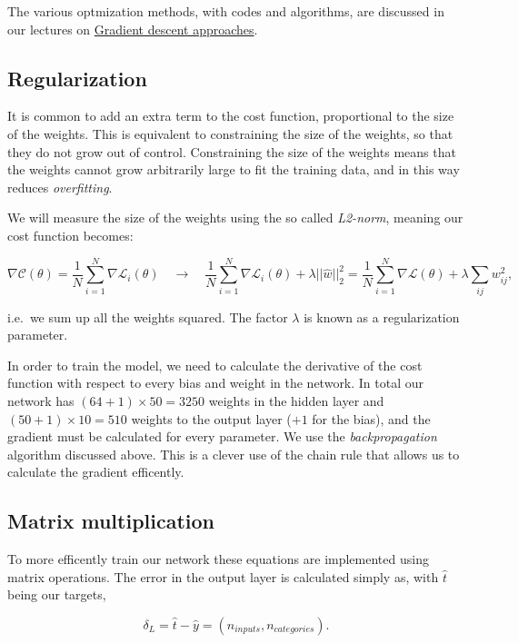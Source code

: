 \documentclass[%
oneside,                 %
final,                   %
10pt]{article}
\begin{document}
\noindent
The various optmization  methods, with codes and algorithms,  are discussed in our lectures on \href{{https://compphysics.github.io/MachineLearning/doc/pub/Splines/html/Splines-bs.html}}{Gradient descent approaches}.

\subsection{Regularization}

It is common to add an extra term to the cost function, proportional
to the size of the weights.  This is equivalent to constraining the
size of the weights, so that they do not grow out of control.
Constraining the size of the weights means that the weights cannot
grow arbitrarily large to fit the training data, and in this way
reduces \emph{overfitting}.

We will measure the size of the weights using the so called \emph{L2-norm}, meaning our cost function becomes:  

$$ \nabla \mathcal{C}(\theta) = \frac{1}{N} \sum_{i=1}^N \nabla \mathcal{L}_i(\theta) \quad \rightarrow \quad
\frac{1}{N} \sum_{i=1}^N \nabla \mathcal{L}_i(\theta) + \lambda \lvert \lvert \hat{w} \rvert \rvert_2^2 
= \frac{1}{N} \sum_{i=1}^N \nabla \mathcal{L}(\theta) + \lambda \sum_{ij} w_{ij}^2,$$  

i.e.~we sum up all the weights squared. The factor $\lambda$ is known as a regularization parameter.


In order to train the model, we need to calculate the derivative of
the cost function with respect to every bias and weight in the
network.  In total our network has $(64 + 1)\times 50=3250$ weights in
the hidden layer and $(50 + 1)\times 10=510$ weights to the output
layer ($+1$ for the bias), and the gradient must be calculated for
every parameter.  We use the \emph{backpropagation} algorithm discussed
above. This is a clever use of the chain rule that allows us to
calculate the gradient efficently. 


\subsection{Matrix  multiplication}

To more efficently train our network these equations are implemented using matrix operations.  
The error in the output layer is calculated simply as, with $\hat{t}$ being our targets,  

$$ \delta_L = \hat{t} - \hat{y} = (n_{inputs}, n_{categories}) .$$  
\end{document}
